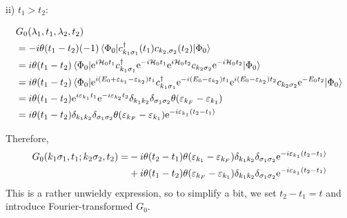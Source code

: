 ii) $t_1>t_2$:

\begin{align*} 
&G_0(\lambda_1, t_1, \lambda_2, t_2) \\
&=-i\theta(t_1-t_2)(-1)\ev{c_{k_1\sigma_1}^\dagger(t_1)c_{k_2,\sigma_2}(t_2)}{\Phi_0} \\
&=i\theta(t_1-t_2)\ev{\e^{i\Ha_0t_1}c_{k_1\sigma_1}^\dagger\e^{-i\Ha_0t_1}\e^{i\Ha_0t_2}c_{k_2\sigma_2}\e^{-i\Ha_0t_2}}{\Phi_0} \\
&= i\theta(t_1-t_2) \ev{\e^{i(E_0 + \ep_{k_1}-\ep_{k_2})t_1}c_{k_1\sigma_1}^\dagger\e^{-i(E_0 - \ep_{k_2})t_1}\e^{i(E_0 - \ep_{k_2})t_2}c_{k_2\sigma_2}\e^{-E_0t_2}}{\Phi_0} \\
&= i\theta(t_1-t_2)\e^{i\ep_{k_1}t_1}\e^{-i\ep_{k_2}t_2}\delta_{k_1k_2}\delta_{\sigma_1\sigma_2}\theta(\ep_{k_F} - \ep_{k_1}) \\
&= i\theta(t_1-t_2)\delta_{k_1k_2}\delta_{\sigma_1\sigma_2}\theta(\ep_{k_F} - \ep_{k_1})\e^{-i\ep_{k_1}(t_2-t_1)}
\end{align*}

Therefore, 
\begin{align}
\label{eq:greens_time_domain}
\begin{split}
G_0(k_1\sigma_1, t_1;k_2\sigma_2, t_2) = &-i\theta(t_2-t_1)\theta(\varepsilon_{k_1} - \varepsilon_{k_F})\delta_{k_1k_2}\delta_{\sigma_1\sigma_2}\mathrm{e}^{-i\varepsilon_{k_1}(t_2-t_1)}\\
&+ i \theta(t_1-t_2)\theta(\varepsilon_{k_F} - \varepsilon_{k_1})\delta_{k_1k_2}\delta_{\sigma_1\sigma_2}\mathrm{e}^{-i\varepsilon_{k_1}(t_2-t_1)}
\end{split}
\end{align}
This is a rather unwieldy expression, so to simplify a bit, we set $t_2-t_1 = t$ and introduce Fourier-transformed $G_0$.

